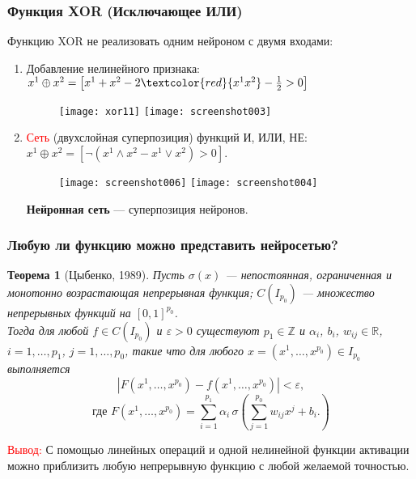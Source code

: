 \documentclass[unicode, notheorems]{beamer}
\newtheorem{theorem}{Теорема}[section]
\begin{document}
\begin{frame}
	\frametitle{Функция XOR (Исключающее ИЛИ)}
	Функцию XOR не реализовать одним нейроном с двумя входами:
	\begin{enumerate}
		\item Добавление нелинейного признака:
		$	x^1 \oplus x^2 = \left[x^1 + x^2 - 2\textcolor{red}{x^1 x^2} - \frac{1}{2} > 0\right]$
		\begin{figure}
			\centering
			\texttt{[image: xor11]}
			\quad \quad \quad 
			\texttt{[image: screenshot003]}
		\end{figure}
		
		\item \textcolor{red}{Сеть} (двухслойная суперпозиция) функций И, ИЛИ, НЕ:
		$x^1 \oplus x^2 = \left[ \neg \left( x^1 \wedge x^2 - x^1 \vee x^2 \right)  > 0\right].$
		\begin{figure}
			\centering
			\texttt{[image: screenshot006]}
			\quad \quad \quad \quad \quad \quad \quad 
			\texttt{[image: screenshot004]}
		\end{figure}
		\textbf{Нейронная сеть} --- суперпозиция нейронов.
	\end{enumerate}

\end{frame}

\begin{frame}
		\frametitle{Любую ли функцию можно представить нейросетью?}

\begin{theorem}[Цыбенко, 1989]
	Пусть $\sigma(x)$ --- непостоянная, ограниченная и монотонно возрастающая непрерывная функция; $C(I_{p_0})$ --- множество непрерывных функций на $[0,1]^{p_0}$.\\
	Тогда для любой $f \in C(I_{p_0})$ и $\varepsilon > 0$ существуют $p_1 \in \mathbb{Z}$ и  $\alpha_i$, $b_i$, $w_{ij} \in \mathbb{R}$, $i=1,\ldots,p_1$, $j=1,\ldots, p_0$, такие что для любого $x=(x^1, \ldots, x^{p_0}) \in I_{p_0}$ выполняется
\[	
	| F(x^1, \ldots, x^{p_0}) - f(x^1, \ldots, x^{p_0})| < \varepsilon,
\]
\[\text{где }
F(x^1, \ldots, x^{p_0})=\sum_{i=1}^{p_1} \alpha_i \, \sigma \left(\sum_{j=1}^{p_0} w_{ij} x^j + b_i.   \right)
\]
	
\end{theorem}
	\textcolor{red}{Вывод:} С помощью линейных операций и одной нелинейной функции активации можно приблизить любую непрерывную функцию с любой желаемой точностью. 
\end{frame}
\end{document}
